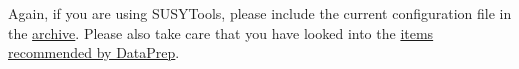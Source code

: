 Again, if you are using SUSYTools, please include the current configuration file in the \href{http://gitlab.cern.ch/atlas-phys-susy-wg/AnalysisSUSYToolsConfigurations}{archive}.  Please also take care that you have looked into the \href{https://twiki.cern.ch/twiki/bin/viewauth/Atlas/DataPreparationCheckListForPhysicsAnalysis}{items recommended by DataPrep}.
